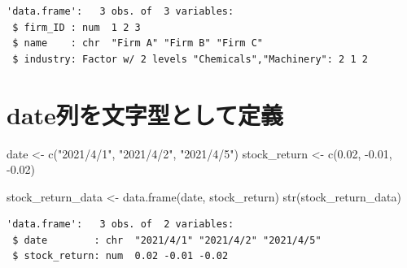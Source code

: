\documentclass[
  letterpaper,
  DIV=11,
  numbers=noendperiod]{scrreprt}
\newenvironment{Shaded}{\begin{snugshade}}{\end{snugshade}}
\newcommand{\DocumentationTok}[1]{\textcolor[rgb]{0.37,0.37,0.37}{\textit{#1}}}
\newcommand{\FloatTok}[1]{\textcolor[rgb]{0.68,0.00,0.00}{#1}}
\newcommand{\FunctionTok}[1]{\textcolor[rgb]{0.28,0.35,0.67}{#1}}
\newcommand{\NormalTok}[1]{\textcolor[rgb]{0.00,0.23,0.31}{#1}}
\newcommand{\OtherTok}[1]{\textcolor[rgb]{0.00,0.23,0.31}{#1}}
\newcommand{\SpecialCharTok}[1]{\textcolor[rgb]{0.37,0.37,0.37}{#1}}
\newcommand{\StringTok}[1]{\textcolor[rgb]{0.13,0.47,0.30}{#1}}
\begin{document}
\begin{verbatim}
'data.frame':   3 obs. of  3 variables:
 $ firm_ID : num  1 2 3
 $ name    : chr  "Firm A" "Firm B" "Firm C"
 $ industry: Factor w/ 2 levels "Chemicals","Machinery": 2 1 2
\end{verbatim}

\begin{Shaded}
\end{Shaded}

\section{date列を文字型として定義}\label{dateux5217ux3092ux6587ux5b57ux578bux3068ux3057ux3066ux5b9aux7fa9}

\begin{Shaded}
\begin{Highlighting}[]
\NormalTok{date }\OtherTok{\textless{}{-}} \FunctionTok{c}\NormalTok{(}\StringTok{"2021/4/1"}\NormalTok{, }\StringTok{"2021/4/2"}\NormalTok{, }\StringTok{"2021/4/5"}\NormalTok{)}
\NormalTok{stock\_return }\OtherTok{\textless{}{-}} \FunctionTok{c}\NormalTok{(}\FloatTok{0.02}\NormalTok{, }\SpecialCharTok{{-}}\FloatTok{0.01}\NormalTok{, }\SpecialCharTok{{-}}\FloatTok{0.02}\NormalTok{)}

\NormalTok{stock\_return\_data }\OtherTok{\textless{}{-}} \FunctionTok{data.frame}\NormalTok{(date, stock\_return) }
\FunctionTok{str}\NormalTok{(stock\_return\_data)}
\end{Highlighting}
\end{Shaded}

\begin{verbatim}
'data.frame':   3 obs. of  2 variables:
 $ date        : chr  "2021/4/1" "2021/4/2" "2021/4/5"
 $ stock_return: num  0.02 -0.01 -0.02
\end{verbatim}

\begin{Shaded}
\end{Shaded}
\end{document}
